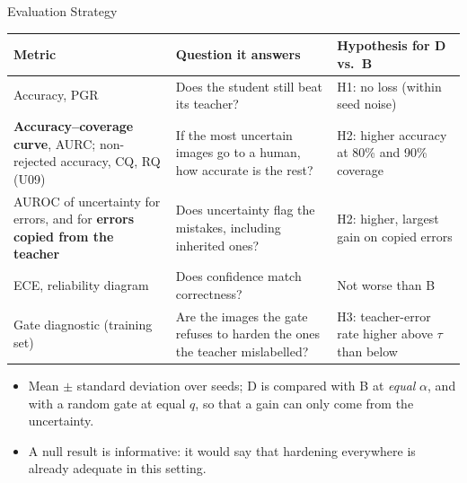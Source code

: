 \documentclass[aspectratio=169,11pt,professionalfonts]{beamer}
\begin{document}
\begin{frame}[t]{Evaluation Strategy}
\footnotesize\setlength{\tabcolsep}{4pt}
\begin{tabular}{@{}p{}p{}p{}@{}}
\toprule
\textbf{Metric} & \textbf{Question it answers} & \textbf{Hypothesis for D vs.\ B}\\
\midrule
Accuracy, PGR & Does the student still beat its teacher? & H1: no loss (within seed noise)\\[0.25em]
\textbf{Accuracy--coverage curve}, AURC; non-rejected accuracy, CQ, RQ (U09) &
If the most uncertain images go to a human, how accurate is the rest? & H2: higher accuracy at 80\% and 90\% coverage\\[0.25em]
AUROC of uncertainty for errors, and for \textbf{errors copied from the teacher} &
Does uncertainty flag the mistakes, including inherited ones? & H2: higher, largest gain on copied errors\\[0.25em]
ECE, reliability diagram & Does confidence match correctness? & Not worse than B\\[0.25em]
Gate diagnostic (training set) & Are the images the gate refuses to harden the ones the teacher mislabelled? &
H3: teacher-error rate higher above $\tau$ than below\\
\bottomrule
\end{tabular}
\vspace{0.5em}
\begin{itemize}\footnotesize
  \item Mean $\pm$ standard deviation over seeds; D is compared with B at \emph{equal} $\alpha$, and with a random
  gate at equal $q$, so that a gain can only come from the uncertainty.
  \item A null result is informative: it would say that hardening everywhere is already adequate in this setting.
\end{itemize}
\end{frame}
\end{document}
